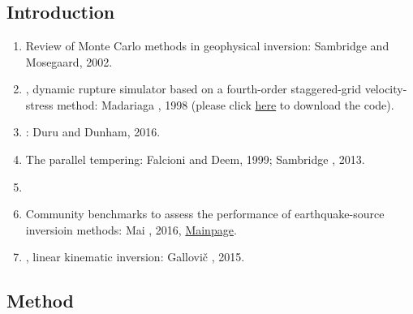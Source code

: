 \renewcommand{\pmk}{Gallovic\_2019\_JGRse\_Bayesian dynamic inversion}
\renewcommand{\prf}{Inversion/\pmk.pdf}
\renewcommand{\pti}{Bayesian dynamic finite-fault inversion:
  1. method and synthetic test}
\renewcommand{\pay}{F. Gallovi\v{c}, \'L. Valentov\'a, J.-P. Ampuero,
  and A.-A. Gabriel}
\renewcommand{\pjo}{JGR Solid Earth}
\renewcommand{\pda}{2019/11/20 Wed.}

\section{\pinfo}
\subsection{Introduction}
\begin{enumerate}[\hspace{10mm}*]
  \item Review of Monte Carlo methods in geophysical inversion:
    Sambridge and Mosegaard, 2002.
  \item {}
    ,
    dynamic rupture simulator based on a fourth-order staggered-grid
    velocity-stress method: Madariaga \etal, 1998 (please click
    \href{http://www.geologie.ens.fr/madariag/Programs/programs.html}{here}
    to download the code).
  \item {}
    :
    Duru and Dunham, 2016.
  \item The parallel tempering: Falcioni and Deem, 1999; Sambridge \etal, 2013.
  \item \sline
  \item Community benchmarks to assess the performance of earthquake-source
    inversioin methods: Mai \etal, 2016,
    \href{http://equake-rc.info/SIV}{Mainpage}.
  \item {}
    ,
    linear kinematic inversion: Gallovi\v{c} \etal, 2015.
\end{enumerate}

\subsection{Method}
